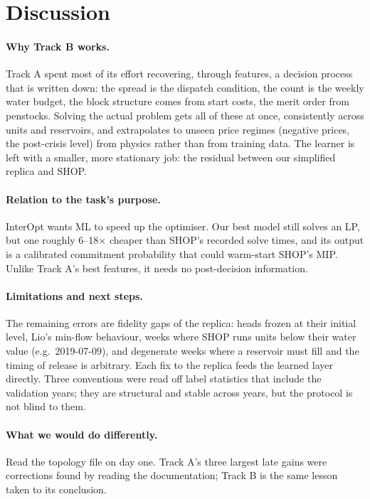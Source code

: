 \documentclass[11pt]{article}
\begin{document}
\section{Discussion}
\label{sec:r-disc}

\paragraph{Why Track B works.} Track A spent most of its effort recovering, through features, a
decision process that is written down: the spread is the dispatch condition, the count is the
weekly water budget, the block structure comes from start costs, the merit order from penstocks.
Solving the actual problem gets all of these at once, consistently across units and reservoirs,
and extrapolates to unseen price regimes (negative prices, the post-crisis level) from physics
rather than from training data. The learner is left with a smaller, more stationary job: the
residual between our simplified replica and SHOP.

\paragraph{Relation to the task's purpose.} InterOpt wants ML to speed up the optimiser. Our best
model still solves an LP, but one roughly 6--18$\times$ cheaper than SHOP's recorded solve times, and its output is a
calibrated commitment probability that could warm-start SHOP's MIP. Unlike Track A's best
features, it needs no post-decision information.

\paragraph{Limitations and next steps.} The remaining errors are fidelity gaps of the replica: heads
frozen at their initial level, Lio's min-flow behaviour, weeks where SHOP runs units below their
water value (e.g.\ 2019-07-09), and degenerate weeks where a reservoir must fill and the timing of
release is arbitrary. Each fix to the replica feeds the learned layer directly. Three conventions
were read off label statistics that include the validation years; they are structural and stable
across years, but the protocol is not blind to them.

\paragraph{What we would do differently.} Read the topology file on day one. Track A's three
largest late gains were corrections found by reading the documentation; Track B is the same lesson
taken to its conclusion.
\end{document}
